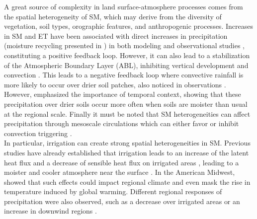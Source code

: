 A great source of complexity in land surface-atmosphere processes comes from the spatial heterogeneity of SM, which may derive from the diversity of vegetation, soil types, orographic features, and anthropogenic processes.
Increases in SM and ET have been associated with direct increases in precipitation (moisture recycling presented in \cite{eltahir_precipitation_1996}) in both modeling and observational studies \citep{koster_observational_2003, guo_glace_2006, wei_dissecting_2012, findell_probability_2011}, constituting a positive feedback loop. However, it can also lead to a stabilization of the Atmospheric Boundary Layer (ABL), inhibiting vertical development and convection \citep{findell_atmospheric_2003-1, ek_influence_2004}. This leads to a negative feedback loop where convective rainfall is more likely to occur over drier soil patches, also noticed in observations \citep{taylor_afternoon_2012, klein_dry_2020}. However, \cite{guillod_reconciling_2015} emphasized the importance of temporal context, showing that these precipitation over drier soils occur more often when soils are moister than usual at the regional scale.
Finally it must be noted that SM heterogeneities can affect precipitation through mesoscale circulations which can either favor or inhibit convection triggering \citep{findell_atmospheric_2003, taylor_frequency_2011, rochetin_morphology_2017}.\\

In particular, irrigation can create strong spatial heterogeneities in SM. Previous studies have already established that irrigation leads to an increase of the latent heat flux and a decrease of sensible heat flux on irrigated areas \citep{pokhrel_incorporating_2012}, leading to a moister and cooler atmosphere near the surface \citep{bonfils_empirical_2007}. 
In the American Midwest, \cite{nocco_observation_2019} showed that such effects could impact regional climate and even mask the rise in temperature induced by global warming. Different regional responses of precipitation were also observed, such as a decrease over irrigated areas \citep{alter_rainfall_2015} or an increase in downwind regions \citep{deangelis_evidence_2010}.

